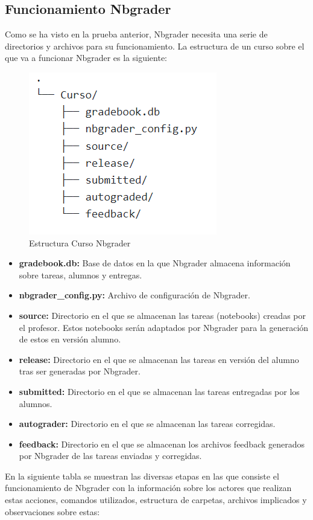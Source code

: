 \subsection{Funcionamiento Nbgrader}
Como se ha visto en la prueba anterior, Nbgrader necesita una serie de directorios y archivos para su funcionamiento. La estructura de un curso sobre el que va a funcionar Nbgrader es la siguiente:
\begin{figure}[H]
    \centering
    \includegraphics[scale=0.7]{img/imgs-memoria/NbgraderTree.PNG}
    \caption{Estructura Curso Nbgrader}
\end{figure}
\begin{itemize}
\item \textbf{gradebook.db:} Base de datos en la que Nbgrader almacena información sobre tareas, alumnos y entregas.
\item \textbf{nbgrader\_config.py:} Archivo de configuración de Nbgrader.
\item \textbf{source:} Directorio en el que se almacenan las tareas (notebooks) creadas por el profesor. Estos notebooks serán adaptados por Nbgrader para la generación de estos en versión alumno.
\item \textbf{release:} Directorio en el que se almacenan las tareas en versión del alumno tras ser generadas por Nbgrader.
\item \textbf{submitted:} Directorio en el que se almacenan las tareas entregadas por los alumnos.
\item \textbf{autograder:} Directorio en el que se almacenan las tareas corregidas.
\item \textbf{feedback:} Directorio en el que se almacenan los archivos feedback generados por Nbgrader de las tareas enviadas y corregidas.
\end{itemize}

En la siguiente tabla se muestran las diversas etapas en las que consiste el funcionamiento de Nbgrader con la información sobre los actores que realizan estas acciones, comandos utilizados, estructura de carpetas, archivos implicados y observaciones sobre estas:


